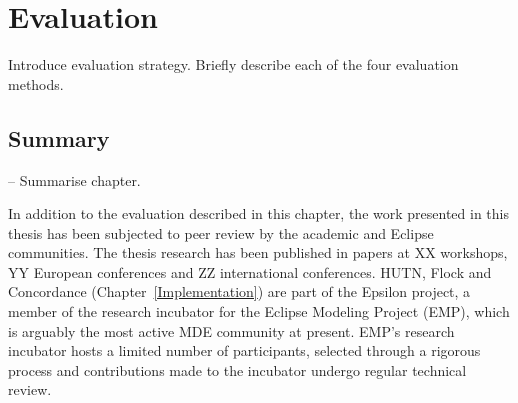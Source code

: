 
\chapter{Evaluation}
\label{Evaluation}
Introduce evaluation strategy. Briefly describe each of the four evaluation methods.








\section{Summary}
-- Summarise chapter.

In addition to the evaluation described in this chapter, the work presented in this thesis has been subjected to peer review by the academic and Eclipse communities. The thesis research has been published in papers at XX workshops, YY European conferences and ZZ international conferences. HUTN, Flock and Concordance (Chapter~\ref{Implementation}) are part of the Epsilon project, a member of the research incubator for the Eclipse Modeling Project (EMP), which is arguably the most active MDE community at present. EMP's research incubator hosts a limited number of participants, selected through a rigorous process and contributions made to the incubator undergo regular technical review.
